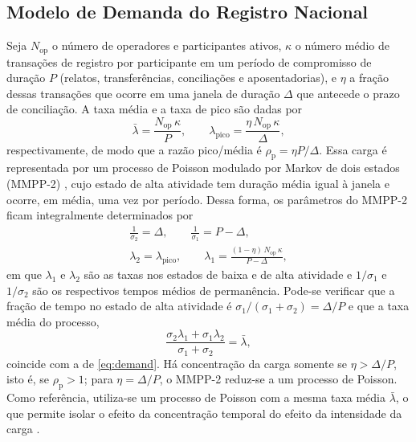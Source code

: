 \subsection{Modelo de Demanda do Registro Nacional}

Seja $N_{\mathrm{op}}$ o número de operadores e participantes ativos, $\kappa$ o número médio de transações de registro por participante em um período de compromisso de duração $P$ (relatos, transferências, conciliações e aposentadorias), e $\eta$ a fração dessas transações que ocorre em uma janela de duração $\Delta$ que antecede o prazo de conciliação. A taxa média e a taxa de pico são dadas por
\begin{equation}
\bar{\lambda} = \frac{N_{\mathrm{op}}\,\kappa}{P}, \qquad \lambda_{\mathrm{pico}} = \frac{\eta\, N_{\mathrm{op}}\,\kappa}{\Delta},
\label{eq:demand}
\end{equation}
respectivamente, de modo que a razão pico/média é $\rho_{\mathrm{p}} = \eta P / \Delta$. Essa carga é representada por um processo de Poisson modulado por Markov de dois estados (MMPP-2) \citep{Fischer1993}, cujo estado de alta atividade tem duração média igual à janela e ocorre, em média, uma vez por período. Dessa forma, os parâmetros do MMPP-2 ficam integralmente determinados por
\begin{gather}
\frac{1}{\sigma_{2}} = \Delta, \qquad \frac{1}{\sigma_{1}} = P - \Delta, \nonumber\\
\lambda_{2} = \lambda_{\mathrm{pico}}, \qquad \lambda_{1} = \frac{(1-\eta)\,N_{\mathrm{op}}\,\kappa}{P - \Delta},
\label{eq:mmpp}
\end{gather}
em que $\lambda_{1}$ e $\lambda_{2}$ são as taxas nos estados de baixa e de alta atividade e $1/\sigma_{1}$ e $1/\sigma_{2}$ são os respectivos tempos médios de permanência. Pode-se verificar que a fração de tempo no estado de alta atividade é $\sigma_{1}/(\sigma_{1}+\sigma_{2}) = \Delta/P$ e que a taxa média do processo,
\begin{equation}
\frac{\sigma_{2}\lambda_{1} + \sigma_{1}\lambda_{2}}{\sigma_{1} + \sigma_{2}} = \bar{\lambda},
\label{eq:meanrate}
\end{equation}
coincide com a de \eqref{eq:demand}. Há concentração da carga somente se $\eta > \Delta/P$, isto é, se $\rho_{\mathrm{p}} > 1$; para $\eta = \Delta/P$, o MMPP-2 reduz-se a um processo de Poisson. Como referência, utiliza-se um processo de Poisson com a mesma taxa média $\bar{\lambda}$, o que permite isolar o efeito da concentração temporal do efeito da intensidade da carga \citep{Paxson1995}.

